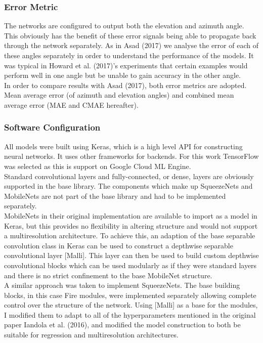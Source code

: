 \documentclass{article}
\begin{document}
\subsubsection{Error Metric}
The networks are configured to output both the elevation and azimuth angle. This obviously has the benefit of these error signals being able to propagate back through the network separately. As in Asad (2017) we analyse the error of each of these angles separately in order to understand the performance of the models. It was typical in Howard et al. (2017)'s experiments that certain examples would perform well in one angle but be unable to gain accuracy in the other angle.\\

In order to compare results with Asad (2017), both error metrics are adopted. Mean average error (of azimuth and elevation angles) and combined mean average error (MAE and CMAE hereafter).

\subsubsection{Software Configuration}
All models were built using Keras, which is a high level API for constructing neural networks. It uses other frameworks for backends. For this work TensorFlow was selected as this is support on Google Cloud ML Engine. \\

Standard convolutional layers and fully-connected, or dense, layers are obviously supported in the base library. The components which make up SqueezeNets and MobileNets are not part of the base library and had to be implemented separately. \\ 

MobileNets in their original implementation are available to import as  a model in Keras, but this provides no flexibility in altering structure and would not support a multiresolution architecture. To achieve this, an adaption of the base separable convolution class in Keras can be used to construct a depthwise separable convolutional layer [Malli]. This layer can then be used to build custom depthwise convolutional blocks which can be used modularly as if they were standard layers and there is no strict confinement to the base MobileNet structure. \\

A similar approach was taken to implement SqueezeNets. The base building blocks, in this case Fire modules, were implemented separately allowing complete control over the structure of the network. Using [Malli] as a base for the modules, I modified them to adapt to all of the hyperparameters mentioned in the original paper Iandola et al. (2016), and modified the model construction to both be suitable for regression and multiresolution architectures. \\
\end{document}
